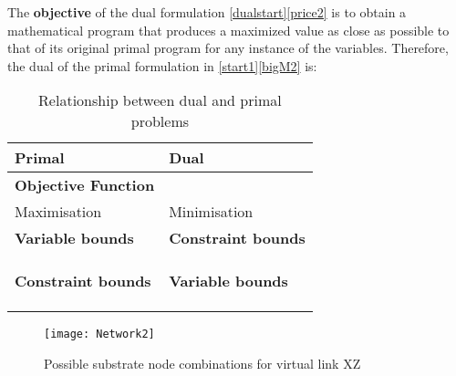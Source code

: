 \documentclass[journal]{IEEEtran}
\begin{document}
The \textbf{objective} of the dual formulation \eqref{dualstart}\eqref{price2} is to obtain a mathematical program that produces a maximized value as close as possible to that of its original primal program for any instance of the variables. Therefore, the dual of the primal formulation in \eqref{start1}\eqref{bigM2} is:
\begin{table}[t]
\renewcommand{\arraystretch}{1.5}
\caption{Relationship between dual and primal problems}
\label{primaldual}
\centering
{}
\begin{tabular}{l||l}
\hline
\bfseries Primal & \bfseries Dual\\
\hline\hline
\textbf{Objective Function} & \\
Maximisation & Minimisation\\ \hline
\textbf{Variable bounds} & \textbf{Constraint bounds}\\
 &  \\
 &  \\
 &  \\ \hline
\textbf{Constraint bounds} & \textbf{Variable bounds}\\
 &  \\
 &  \\
 &  \\
\hline
\end{tabular}
\end{table}








\begin{figure}[t]
  {\texttt{[image: Network2]}}
  \caption{Possible substrate node combinations for virtual link XZ}
  \label{Diagram2}
\end{figure}
\end{document}
